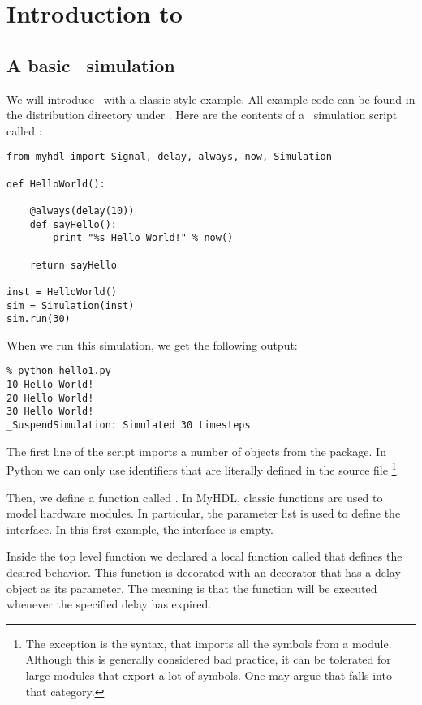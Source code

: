 \chapter{Introduction to \myhdl\ \label{intro}}

\section{A basic \myhdl\ simulation \label{intro-basic}}

We will introduce \myhdl\ with a classic  style
example. All example code can be found in the distribution directory
under .  Here are the contents of a \myhdl\
simulation script called :

\begin{verbatim}
from myhdl import Signal, delay, always, now, Simulation

def HelloWorld():
    
    @always(delay(10))
    def sayHello():
        print "%s Hello World!" % now()

    return sayHello

inst = HelloWorld()
sim = Simulation(inst)
sim.run(30)
\end{verbatim}

When we run this simulation, we get the following output:

\begin{verbatim}
% python hello1.py
10 Hello World!
20 Hello World!
30 Hello World!
_SuspendSimulation: Simulated 30 timesteps
\end{verbatim}

The first line of the script imports a number of objects from the
\code{myhdl} package. In Python we can only use identifiers that are
literally defined in the source file 
\footnote{The exception is the  syntax,
that imports all the symbols from a module. Although this is generally
considered bad practice, it can be tolerated for large modules that
export a lot of symbols. One may argue that
 falls into that category.}.

Then, we define a function called . In MyHDL,
classic functions are used to model hardware modules. In particular,
the parameter list is used to define the interface. In this first
example, the interface is empty.

Inside the top level function we declared a local function called
\function{sayHello} that defines the desired behavior. This function
is decorated with an \function{@always} decorator that has a delay
object as its parameter.  The meaning is that the function will be
executed whenever the specified delay has expired.

